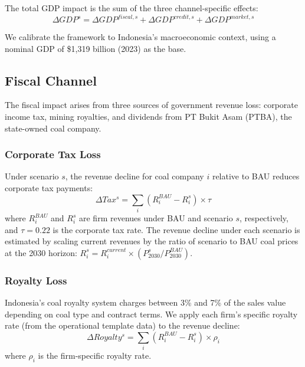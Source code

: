 The total GDP impact is the sum of the three channel-specific effects:
\begin{equation}
\label{eq:total_gdp}
\Delta GDP^s = \Delta GDP^{fiscal,s} + \Delta GDP^{credit,s} + \Delta GDP^{market,s}
\end{equation}

We calibrate the framework to Indonesia's macroeconomic context, using a nominal GDP of \$1,319 billion (2023) as the base.

\subsection{Fiscal Channel}
\label{subsec:fiscal_channel}

The fiscal impact arises from three sources of government revenue loss: corporate income tax, mining royalties, and dividends from PT Bukit Asam (PTBA), the state-owned coal company.

\subsubsection{Corporate Tax Loss}

Under scenario $s$, the revenue decline for coal company $i$ relative to BAU reduces corporate tax payments:
\begin{equation}
\label{eq:tax_loss}
\Delta Tax^s = \sum_{i} \left(R_i^{BAU} - R_i^s\right) \times \tau
\end{equation}
where $R_i^{BAU}$ and $R_i^s$ are firm revenues under BAU and scenario $s$, respectively, and $\tau = 0.22$ is the corporate tax rate. The revenue decline under each scenario is estimated by scaling current revenues by the ratio of scenario to BAU coal prices at the 2030 horizon: $R_i^s = R_i^{current} \times (P^s_{2030} / P^{BAU}_{2030})$.

\subsubsection{Royalty Loss}

Indonesia's coal royalty system charges between 3\% and 7\% of the sales value depending on coal type and contract terms. We apply each firm's specific royalty rate (from the operational template data) to the revenue decline:
\begin{equation}
\label{eq:royalty_loss}
\Delta Royalty^s = \sum_{i} \left(R_i^{BAU} - R_i^s\right) \times \rho_i
\end{equation}
where $\rho_i$ is the firm-specific royalty rate.

